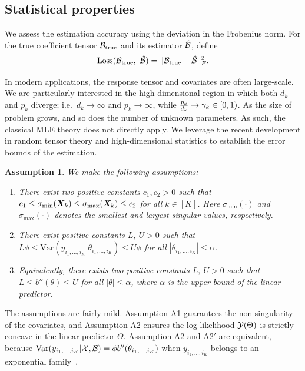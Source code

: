 \documentclass{article}
\theoremstyle{plain}
\newtheorem{assumption}{Assumption}
\theoremstyle{definition}
\begin{document}
\subsection{Statistical properties}
We assess the estimation accuracy using the deviation in the Frobenius norm. For the true coefficient tensor $\mathcal{B}_{\text{true}}$ and its estimator $\hat {\mathcal{B}}$, define
\[
\text{Loss}(\mathcal{B}_{\text{true}},\ \hat {\mathcal{B}})=\lVert\mathcal{B}_{\text{true}}- \hat {\mathcal{B}}\rVert_F^2.
\]

In modern applications, the response tensor and covariates are often large-scale. We are particularly interested in the high-dimensional region in which both $d_k$ and $p_k$ diverge; i.e.\ $d_k\to \infty$ and $p_k\to\infty$, while ${p_k\over d_k} \to \gamma_k \in[0,1)$. As the size of problem grows, and so does the number of unknown parameters. As such, the classical MLE theory does not directly apply. We leverage the recent development in random tensor theory and high-dimensional statistics to establish the error bounds of the estimation. 

\begin{assumption}\label{ass}We make the following assumptions:
\begin{enumerate}[itemsep=-.5pt,topsep=-.5pt,leftmargin=*,partopsep=-.3pt]
\item [A1.] There exist two positive constants $c_1, c_2>0$ such that $c_1\leq \sigma_{\min}(\bm X_k)\leq  \sigma_{\max}(\bm X_k)\leq c_2$ for all $k\in[K]$. Here $\sigma_{\text{min}}(\cdot)$ and $\sigma_{\text{max}}(\cdot)$ denotes the smallest and largest singular values, respectively.
\item [A2.] There exist positive constants $L,\ U>0$ such that $L\phi \leq \text{Var}(y_{i_1,\ldots,i_K}|\theta_{i_1,\ldots,i_K})\leq U\phi $ for all $|\theta_{i_1,\ldots,i_K}|\leq \alpha$.
\item[A2$'$.] Equivalently, there exists two positive constants $L,\ U>0$ such that $L\leq b''(\theta) \leq U$ for all $|\theta|\leq \alpha$, where $\alpha$ is the upper bound of the linear predictor. 

\end{enumerate}
\end{assumption}
The assumptions are fairly mild. Assumption A1 guarantees the non-singularity of the covariates, and Assumption A2 ensures the log-likelihood $\mathcal{Y}(\Theta)$ is strictly concave in the linear predictor $\Theta$. Assumption A2 and A2$'$ are equivalent, because $\text{Var}(y_{i_1,\ldots,i_K}|\mathcal{X},\mathcal{B})=\phi b''(\theta_{i_1,\ldots,i_K})$ when $y_{i_1,\ldots,i_K}$ belongs to an exponential family~\cite{mccullagh1989generalized}. 
\end{document}
